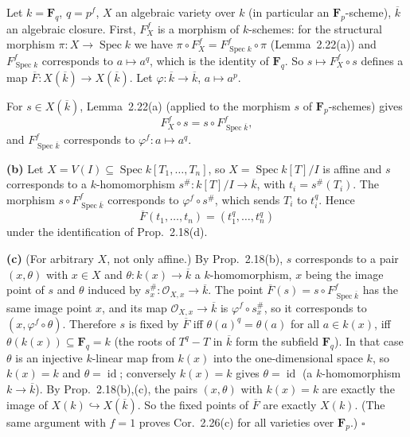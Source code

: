 \documentclass[11pt]{article}
\begin{document}
\pf
Let $k=\mathbf F_q$, $q=p^f$, $X$ an algebraic variety over $k$ (in particular an $\mathbf F_p$-scheme), $\overline k$ an algebraic closure. First, $F_X^f$ is a morphism of $k$-schemes: for the structural morphism $\pi:X\to\operatorname{Spec}k$ we have $\pi\circ F_X^f=F_{\operatorname{Spec}k}^f\circ\pi$ (Lemma~2.22(a)) and $F_{\operatorname{Spec}k}^f$ corresponds to $a\mapsto a^q$, which is the identity of $\mathbf F_q$. So $s\mapsto F_X^f\circ s$ defines a map $\overline F:X(\overline k)\to X(\overline k)$. Let $\varphi:\overline k\to\overline k$, $a\mapsto a^p$.

For $s\in X(\overline k)$, Lemma~2.22(a) (applied to the morphism $s$ of $\mathbf F_p$-schemes) gives
\[ F_X^f\circ s=s\circ F_{\operatorname{Spec}\overline k}^f, \]
and $F_{\operatorname{Spec}\overline k}^f$ corresponds to $\varphi^f:a\mapsto a^q$.

\textbf{(b)} Let $X=V(I)\subseteq\operatorname{Spec}k[T_1,\dots,T_n]$, so $X=\operatorname{Spec}k[T]/I$ is affine and $s$ corresponds to a $k$-homomorphism $s^\#:k[T]/I\to\overline k$, with $t_i=s^\#(T_i)$. The morphism $s\circ F^f_{\operatorname{Spec}\overline k}$ corresponds to $\varphi^f\circ s^\#$, which sends $T_i$ to $t_i^q$. Hence
\[ \overline F(t_1,\dots,t_n)=(t_1^q,\dots,t_n^q) \]
under the identification of Prop.~2.18(d).

\textbf{(c)} (For arbitrary $X$, not only affine.) By Prop.~2.18(b), $s$ corresponds to a pair $(x,\theta)$ with $x\in X$ and $\theta:k(x)\to\overline k$ a $k$-homomorphism, $x$ being the image point of $s$ and $\theta$ induced by $s^\#_x:\mathcal O_{X,x}\to\overline k$. The point $\overline F(s)=s\circ F^f_{\operatorname{Spec}\overline k}$ has the same image point $x$, and its map $\mathcal O_{X,x}\to\overline k$ is $\varphi^f\circ s^\#_x$, so it corresponds to $(x,\varphi^f\circ\theta)$. Therefore $s$ is fixed by $\overline F$ iff $\theta(a)^q=\theta(a)$ for all $a\in k(x)$, iff $\theta(k(x))\subseteq\mathbf F_q=k$ (the roots of $T^q-T$ in $\overline k$ form the subfield $\mathbf F_q$). In that case $\theta$ is an injective $k$-linear map from $k(x)$ into the one-dimensional space $k$, so $k(x)=k$ and $\theta=\operatorname{id}$; conversely $k(x)=k$ gives $\theta=\operatorname{id}$ (a $k$-homomorphism $k\to\overline k$). By Prop.~2.18(b),(c), the pairs $(x,\theta)$ with $k(x)=k$ are exactly the image of $X(k)\hookrightarrow X(\overline k)$. So the fixed points of $\overline F$ are exactly $X(k)$. (The same argument with $f=1$ proves Cor.~2.26(c) for all varieties over $\mathbf F_p$.) \hfill$\square$
\end{document}
